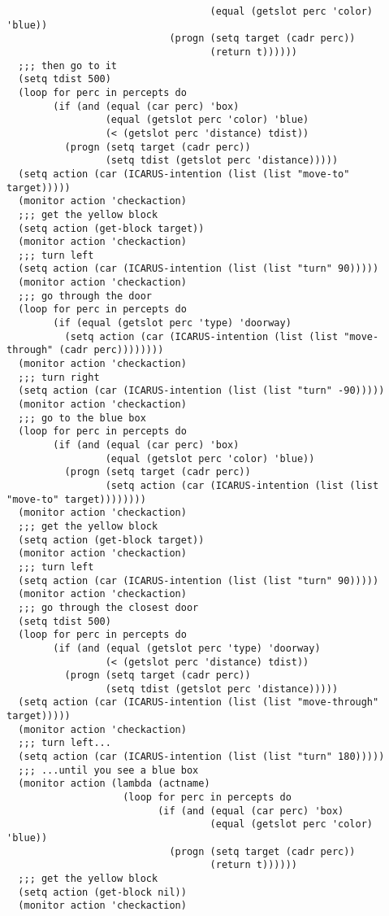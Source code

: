 \documentclass{article}
\begin{document}
\begin{verbatim}
                                   (equal (getslot perc 'color) 'blue))
                            (progn (setq target (cadr perc))
                                   (return t))))))
  ;;; then go to it
  (setq tdist 500)
  (loop for perc in percepts do
        (if (and (equal (car perc) 'box)
                 (equal (getslot perc 'color) 'blue)
                 (< (getslot perc 'distance) tdist))
          (progn (setq target (cadr perc))
                 (setq tdist (getslot perc 'distance)))))
  (setq action (car (ICARUS-intention (list (list "move-to" target)))))
  (monitor action 'checkaction)
  ;;; get the yellow block
  (setq action (get-block target))
  (monitor action 'checkaction)
  ;;; turn left
  (setq action (car (ICARUS-intention (list (list "turn" 90)))))
  (monitor action 'checkaction)
  ;;; go through the door
  (loop for perc in percepts do
        (if (equal (getslot perc 'type) 'doorway)
          (setq action (car (ICARUS-intention (list (list "move-through" (cadr perc))))))))
  (monitor action 'checkaction)
  ;;; turn right
  (setq action (car (ICARUS-intention (list (list "turn" -90)))))
  (monitor action 'checkaction)
  ;;; go to the blue box
  (loop for perc in percepts do
        (if (and (equal (car perc) 'box)
                 (equal (getslot perc 'color) 'blue))
          (progn (setq target (cadr perc))
                 (setq action (car (ICARUS-intention (list (list "move-to" target))))))))
  (monitor action 'checkaction)
  ;;; get the yellow block
  (setq action (get-block target))
  (monitor action 'checkaction)
  ;;; turn left
  (setq action (car (ICARUS-intention (list (list "turn" 90)))))
  (monitor action 'checkaction)
  ;;; go through the closest door
  (setq tdist 500)
  (loop for perc in percepts do
        (if (and (equal (getslot perc 'type) 'doorway)
                 (< (getslot perc 'distance) tdist))
          (progn (setq target (cadr perc))
                 (setq tdist (getslot perc 'distance)))))
  (setq action (car (ICARUS-intention (list (list "move-through" target)))))
  (monitor action 'checkaction)
  ;;; turn left...
  (setq action (car (ICARUS-intention (list (list "turn" 180)))))
  ;;; ...until you see a blue box
  (monitor action (lambda (actname)
                    (loop for perc in percepts do
                          (if (and (equal (car perc) 'box)
                                   (equal (getslot perc 'color) 'blue))
                            (progn (setq target (cadr perc))
                                   (return t))))))
  ;;; get the yellow block
  (setq action (get-block nil))
  (monitor action 'checkaction)

\end{verbatim}
\end{document}
